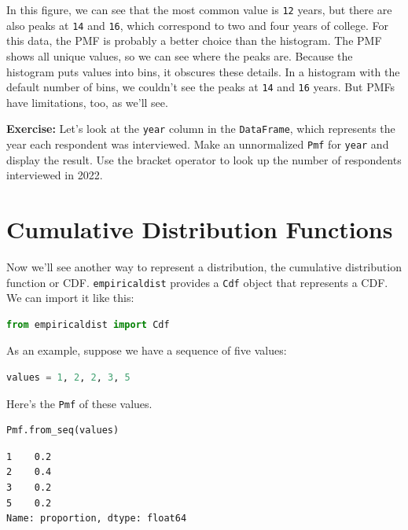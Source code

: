 In this figure, we can see that the most common value is
\passthrough{\lstinline!12!} years, but there are also peaks at
\passthrough{\lstinline!14!} and \passthrough{\lstinline!16!}, which
correspond to two and four years of college. For this data, the PMF is
probably a better choice than the histogram. The PMF shows all unique
values, so we can see where the peaks are. Because the histogram puts
values into bins, it obscures these details. In a histogram with the
default number of bins, we couldn't see the peaks at
\passthrough{\lstinline!14!} and \passthrough{\lstinline!16!} years. But
PMFs have limitations, too, as we'll see.

\textbf{Exercise:} Let's look at the \passthrough{\lstinline!year!}
column in the \passthrough{\lstinline!DataFrame!}, which represents the
year each respondent was interviewed. Make an unnormalized
\passthrough{\lstinline!Pmf!} for \passthrough{\lstinline!year!} and
display the result. Use the bracket operator to look up the number of
respondents interviewed in 2022.

\hypertarget{cumulative-distribution-functions}{%
\section{Cumulative Distribution
Functions}\label{cumulative-distribution-functions}}

Now we'll see another way to represent a distribution, the cumulative
distribution function or CDF. \passthrough{\lstinline!empiricaldist!}
provides a \passthrough{\lstinline!Cdf!} object that represents a CDF.
We can import it like this:

\begin{lstlisting}[language=Python,style=source]
from empiricaldist import Cdf
\end{lstlisting}

As an example, suppose we have a sequence of five values:

\begin{lstlisting}[language=Python,style=source]
values = 1, 2, 2, 3, 5  
\end{lstlisting}

Here's the \passthrough{\lstinline!Pmf!} of these values.

\begin{lstlisting}[language=Python,style=source]
Pmf.from_seq(values)
\end{lstlisting}

\begin{lstlisting}[style=output]
1    0.2
2    0.4
3    0.2
5    0.2
Name: proportion, dtype: float64
\end{lstlisting}

